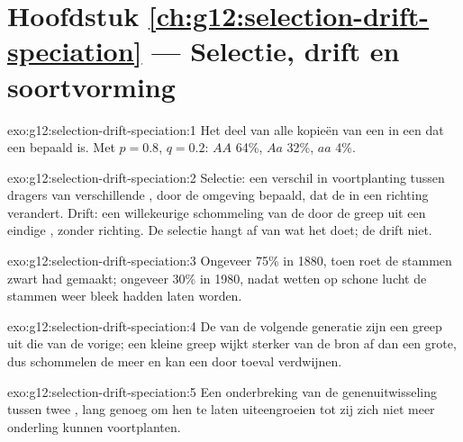 \section*{Hoofdstuk \ref{ch:g12:selection-drift-speciation} --- Selectie, drift en soortvorming}

\begin{solution}{exo:g12:selection-drift-speciation:1}
Het deel van alle kopieën van een  in een  dat een bepaald
 is. Met $p = 0.8$, $q = 0.2$: $AA$ 64\%, $Aa$ 32\%, $aa$ 4\%.
\end{solution}

\begin{solution}{exo:g12:selection-drift-speciation:2}
Selectie: een verschil in voortplanting tussen dragers van verschillende
, door de omgeving bepaald, dat de  in een richting
verandert. Drift: een willekeurige schommeling van de  door de
greep uit een eindige , zonder richting. De selectie hangt af van
wat het  doet; de drift niet.
\end{solution}

\begin{solution}{exo:g12:selection-drift-speciation:3}
Ongeveer 75\% in 1880, toen roet de stammen zwart had gemaakt; ongeveer
30\% in 1980, nadat wetten op schone lucht de stammen weer bleek hadden
laten worden.
\end{solution}

\begin{solution}{exo:g12:selection-drift-speciation:4}
De  van de volgende generatie zijn een greep uit die van de vorige;
een kleine greep wijkt sterker van de bron af dan een grote, dus
schommelen de  meer en kan een  door toeval verdwijnen.
\end{solution}

\begin{solution}{exo:g12:selection-drift-speciation:5}
Een onderbreking van de genenuitwisseling tussen twee , lang
genoeg om hen te laten uiteengroeien tot zij zich niet meer onderling
kunnen voortplanten.
\end{solution}

